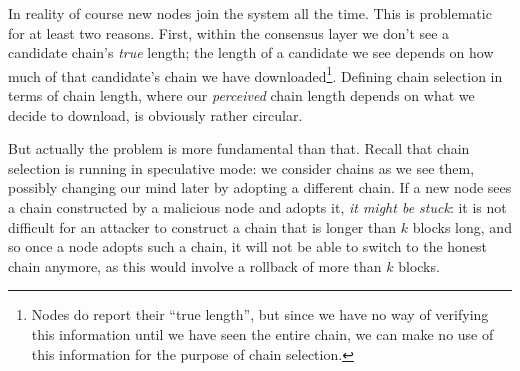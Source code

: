 In reality of course new nodes join the system all the time. This is problematic
for at least two reasons. First, within the consensus layer we don't see a
candidate chain's \emph{true} length; the length of a candidate we see depends
on how much of that candidate's chain we have downloaded\footnote{Nodes do
report their ``true length'', but since we have no way of verifying this
information until we have seen the entire chain, we can make no use of this
information for the purpose of chain selection.}. Defining chain
selection in terms of chain length, where our \emph{perceived} chain length
depends on what we decide to download, is obviously rather circular.

But actually the problem is more fundamental than that. Recall that chain
selection is running in speculative mode: we consider chains as we see them,
possibly changing our mind later by adopting a different chain. If a new node
sees a chain constructed by a malicious node and adopts it, \emph{it might be
stuck}: it is not difficult for an attacker to construct a chain that is longer
than $k$ blocks long, and so once a node adopts such a chain, it will not be
able to switch to the honest chain anymore, as this would involve a rollback
of more than $k$ blocks.

